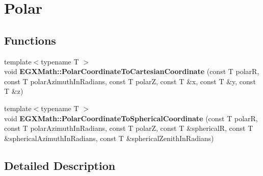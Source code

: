 \hypertarget{group___e_g_x_math-_conversions-_coordinate_conversions-_polar}{}\section{Polar}
\label{group___e_g_x_math-_conversions-_coordinate_conversions-_polar}
\subsection*{Functions}
\begin{DoxyCompactItemize}
\item 
\mbox{\label{group___e_g_x_math-_conversions-_coordinate_conversions-_polar_ga3f564aad9b0f33f8dbd71b457d3e7a40}} 
{\footnotesize template$<$typename T $>$ }\\void {\bfseries E\+G\+X\+Math\+::\+Polar\+Coordinate\+To\+Cartesian\+Coordinate} (const T polarR, const T polar\+Azimuth\+In\+Radians, const T polarZ, const T \&x, const T \&y, const T \&z)
\item 
\mbox{\label{group___e_g_x_math-_conversions-_coordinate_conversions-_polar_ga13532bdbc27549fe75466455b378f57f}} 
{\footnotesize template$<$typename T $>$ }\\void {\bfseries E\+G\+X\+Math\+::\+Polar\+Coordinate\+To\+Spherical\+Coordinate} (const T polarR, const T polar\+Azimuth\+In\+Radians, const T polarZ, const T \&sphericalR, const T \&spherical\+Azimuth\+In\+Radians, const T \&spherical\+Zenith\+In\+Radians)
\end{DoxyCompactItemize}


\subsection{Detailed Description}

